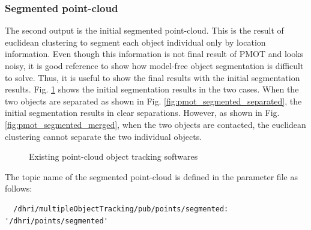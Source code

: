 \documentclass[a4paper,twoside, openright,12pt]{report}
\begin{document}
\subsubsection{Segmented point-cloud}

The second output is the initial segmented point-cloud. This is the result of euclidean clustering to segment each object individual only by location information. 
Even though this information is not final result of PMOT and looks noisy, it is good reference to show how model-free object segmentation is difficult to solve. Thus, it is useful to show the final results with the initial segmentation results.
Fig. \ref{fig:pmot_segmented} shows the initial segmentation results in the two cases. When the two objects are separated as shown in Fig. \ref{fig:pmot_segmented_separated}, the initial segmentation results in clear separations. However, as shown in Fig. \ref{fig:pmot_segmented_merged}, when the two objects are contacted, the euclidean clustering cannot separate the two individual objects.
\begin{figure}[b]
	\centering
	\hfil
	\caption{Existing point-cloud object tracking softwares}
	\label{fig:pmot_segmented}
\end{figure}


The topic name of the segmented point-cloud is defined in the parameter file as follows: 
\begin{verbatim}
  /dhri/multipleObjectTracking/pub/points/segmented: '/dhri/points/segmented'
\end{verbatim}
\end{document}
